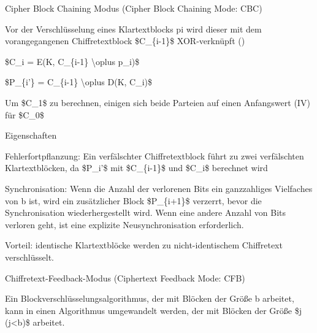 \documentclass[a4paper]{article}
\begin{document}
\begin{multicols}{3}
      Cipher Block Chaining Modus (Cipher Block Chaining Mode: CBC)

      \begin{itemize*}
            \item
            Vor der Verschlüsselung eines Klartextblocks pi wird dieser mit dem
            vorangegangenen Chiffretextblock \$C\_\{i-1\}\$ XOR-verknüpft ()

            \begin{itemize*}
                  \item \$C\_i = E(K, C\_\{i-1\} \textbackslash oplus p\_i)\$
                  \item \$P\_\{i'\} = C\_\{i-1\} \textbackslash oplus D(K, C\_i)\$
                  \item Um \$C\_1\$ zu berechnen, einigen sich beide Parteien auf einen Anfangswert (IV) für \$C\_0\$
            \end{itemize*}
            \item
            Eigenschaften

            \begin{itemize*}
                  \item Fehlerfortpflanzung: Ein verfälschter Chiffretextblock führt zu zwei verfälschten Klartextblöcken, da \$P\_i'\$ mit \$C\_\{i-1\}\$ und \$C\_i\$ berechnet wird
                  \item Synchronisation: Wenn die Anzahl der verlorenen Bits ein ganzzahliges Vielfaches von b ist, wird ein zusätzlicher Block \$P\_\{i+1\}\$ verzerrt, bevor die Synchronisation wiederhergestellt wird. Wenn eine andere Anzahl von Bits verloren geht, ist eine explizite Neusynchronisation erforderlich.
                  \item Vorteil: identische Klartextblöcke werden zu nicht-identischem Chiffretext verschlüsselt.
            \end{itemize*}
      \end{itemize*}

      Chiffretext-Feedback-Modus (Ciphertext Feedback Mode: CFB)

      \begin{itemize*}
            \item
            Ein Blockverschlüsselungsalgorithmus, der mit Blöcken der Größe b
            arbeitet, kann in einen Algorithmus umgewandelt werden, der mit
            Blöcken der Größe \$j (j\textless b)\$ arbeitet.


\end{itemize*}
\end{multicols}
\end{document}
